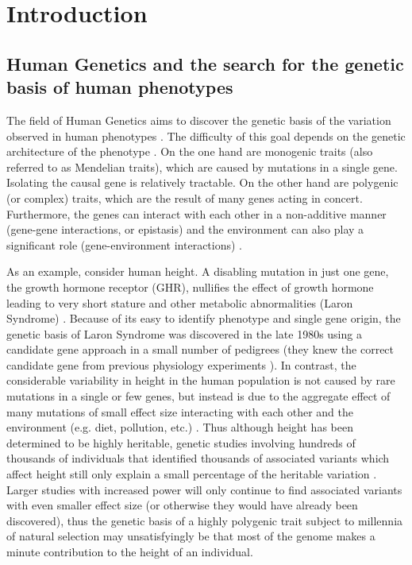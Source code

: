 \chapter{Introduction}

\section{Human Genetics and the search for the genetic basis of human phenotypes}

The field of Human Genetics aims to discover the genetic basis of the
variation observed in human phenotypes \citep{Strachan2011}. The difficulty of this goal
depends on the genetic architecture of the phenotype \citep{DiRienzo2006, Bodmer2008, Schork2009}. On the one hand
are monogenic traits (also referred to as Mendelian traits), which are
caused by mutations in a single gene. Isolating the causal gene is
relatively tractable. On the other hand are polygenic (or complex)
traits, which are the result of many genes acting in
concert. Furthermore, the genes can interact with each other in a
non-additive manner (gene-gene interactions, or epistasis) \citep{Cordell2009} and the
environment can also play a significant role (gene-environment
interactions) \citep{Ober2011}.

As an example, consider human height. A disabling mutation in just one
gene, the growth hormone receptor (GHR), nullifies the effect of
growth hormone leading to very short stature and other metabolic
abnormalities (Laron Syndrome) \citep{Laron2011}. Because of its easy to identify
phenotype and single gene origin, the genetic basis of Laron Syndrome
was discovered in the late 1980s using a candidate gene approach
in a small number of pedigrees \citep{Amselem1989, Godowski1989, Shevah2011}
(they knew the correct candidate gene from previous physiology experiments \citep{Eshet1984}). In
contrast, the considerable variability in height in the human
population is not caused by rare mutations in a single or few genes,
but instead is due to the aggregate effect of many mutations of small
effect size interacting with each other and the environment
(e.g. diet, pollution, etc.) \citep{Lettre2011, Turchin2012}. Thus although height has been determined
to be highly heritable, genetic studies involving hundreds of
thousands of individuals that identified thousands of associated
variants which affect height still only explain a small percentage of
the heritable variation \citep{LangoAllen2010, Wood2014}. Larger studies with increased power will only
continue to find associated variants with even smaller effect size (or
otherwise they would have already been discovered), thus the genetic
basis of a highly polygenic trait subject to millennia of natural
selection may unsatisfyingly be that most of the genome makes a minute
contribution to the height of an individual.

